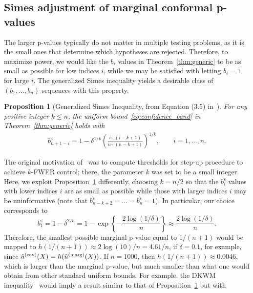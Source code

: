 \documentclass[11pt]{article}
\newtheorem{prop}{Proposition}
\def\marg{\textnormal{(marg)}}
\def\cond{\textnormal{(ccv)}}
\begin{document}
\subsection{Simes adjustment of marginal conformal p-values} \label{sec:gen-simes}

The larger p-values typically do not matter in multiple testing problems, as it is the small ones that determine which hypotheses are rejected.
Therefore, to maximize power, we would like the $b_i$ values in Theorem~\ref{thm:generic} to be as small as possible for low indices $i$, while we may be satisfied with letting $b_{i} = 1$ for large $i$.
The generalized Simes inequality yields a desirable class of $(b_1, \ldots, b_n)$ sequences with this property. 

\begin{prop}[Generalized Simes Inequality, from Equation (3.5) in~\cite{sarkar2008generalizing}]\label{prop:simes}
For any positive integer $k\le n$, the uniform bound~\eqref{eq:confidence_band} in Theorem~\ref{thm:generic} holds with
\begin{align} \label{eq:simes-sequence}
b^{\mathrm{s}}_{n + 1 - i} = 1 - \delta^{1/k}\left(\frac{i\cdots (i - k + 1)}{n\cdots (n - k + 1)}\right)^{1/k}, \qquad i = 1, \ldots, n.
\end{align}
\end{prop}
The original motivation of~\cite{sarkar2008generalizing} was to compute thresholds for step-up procedure to achieve $k$-FWER control; there, the parameter $k$ was set to be a small integer.
Here, we exploit Proposition~\ref{prop:simes} differently, choosing {$k = n / 2$} so that the $b^{\mathrm{s}}_{i}$ values {with} lower indices $i$ are as small as possible while those {with larger indices} $i$ may be uninformative (note that $b^{\mathrm{s}}_{n - k + 2} = \ldots = b^{\mathrm{s}}_{n} = 1$).
In particular, our choice corresponds to
\begin{equation*}
{b^{\mathrm{s}}_{1} = 1 - \delta^{2/n} = 1 - \exp\left\{-\frac{2\log(1 / \delta)}{n}\right\} \approx \frac{2\log(1 / \delta)}{n}.}
\end{equation*}
Therefore, the smallest possible marginal p-value equal to $1/(n+1)$ would be mapped to $h(1 / (n + 1)) \approx 2\log(10) / n = 4.61 / n$, if $\delta = 0.1$, for example, since $\hat{u}^\cond(X) = h(\hat{u}^\marg(X))$.
If $n = 1000$, then $h(1 / (n + 1)) \approx 0.0046$, which is larger than the marginal p-value, but much smaller than what one would obtain from other standard uniform bounds. For example, the DKWM inequality~\citep{dvoretzky1956asymptotic, massart1990tight} would imply a result similar to that of Proposition~\ref{prop:simes} but with 
\end{document}
